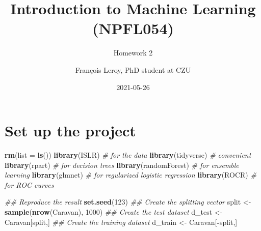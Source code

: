 \documentclass[
  12pt,
  oneside]{report}
\title{Introduction to Machine Learning\\
(NPFL054)}
\subtitle{Homework 2}
\author{François Leroy, PhD student at CZU}
\date{2021-05-26}
\newenvironment{Shaded}{\begin{snugshade}}{\end{snugshade}}
\newcommand{\CommentTok}[1]{\textcolor[rgb]{0.56,0.35,0.01}{\textit{#1}}}
\newcommand{\DataTypeTok}[1]{\textcolor[rgb]{0.13,0.29,0.53}{#1}}
\newcommand{\DecValTok}[1]{\textcolor[rgb]{0.00,0.00,0.81}{#1}}
\newcommand{\KeywordTok}[1]{\textcolor[rgb]{0.13,0.29,0.53}{\textbf{#1}}}
\newcommand{\NormalTok}[1]{#1}
\newcommand{\OperatorTok}[1]{\textcolor[rgb]{0.81,0.36,0.00}{\textbf{#1}}}
\newcommand{\StringTok}[1]{\textcolor[rgb]{0.31,0.60,0.02}{#1}}
\begin{document}
\maketitle


\cleardoublepage 
{}

{
\hypersetup{linkcolor=}
\setcounter{tocdepth}{1}
\tableofcontents
\newpage
}
\vspace{50mm}


\cleardoublepage 
{}


\hypertarget{set-up-the-project}{%
\chapter*{Set up the project}\label{set-up-the-project}}

\begin{Shaded}
\begin{Highlighting}[]
\KeywordTok{rm}\NormalTok{(}\DataTypeTok{list =} \KeywordTok{ls}\NormalTok{())}
\KeywordTok{library}\NormalTok{(ISLR) }\CommentTok{# for the data}
\KeywordTok{library}\NormalTok{(tidyverse) }\CommentTok{# convenient}
\KeywordTok{library}\NormalTok{(rpart) }\CommentTok{# for decision trees}
\KeywordTok{library}\NormalTok{(randomForest) }\CommentTok{# for ensemble learning}
\KeywordTok{library}\NormalTok{(glmnet) }\CommentTok{# for regularized logistic regression}
\KeywordTok{library}\NormalTok{(ROCR) }\CommentTok{# for ROC curves}
\end{Highlighting}
\end{Shaded}

\begin{Shaded}
\begin{Highlighting}[]
\CommentTok{## Reproduce the result}
\KeywordTok{set.seed}\NormalTok{(}\DecValTok{123}\NormalTok{)}
\CommentTok{## Create the splitting vector}
\NormalTok{split <-}\StringTok{ }\KeywordTok{sample}\NormalTok{(}\KeywordTok{nrow}\NormalTok{(Caravan), }\DecValTok{1000}\NormalTok{)}
\CommentTok{## Create the test dataset}
\NormalTok{d_test <-}\StringTok{ }\NormalTok{Caravan[split,]}
\CommentTok{## Create the training dataset}
\NormalTok{d_train <-}\StringTok{ }\NormalTok{Caravan[}\OperatorTok{-}\NormalTok{split,]}
\end{Highlighting}
\end{Shaded}
\end{document}
